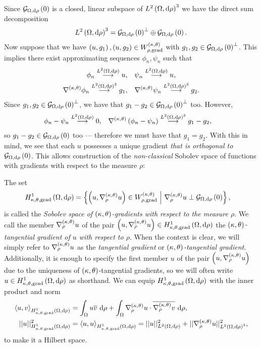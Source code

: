Since $\gradZero{\ddom}{\rho}$ is a closed, linear subspace of $\ltwo{\ddom}{\rho}^3$ we have the direct sum decomposition
\begin{align*}
	\ltwo{\ddom}{\rho}^3 = \gradZero{\ddom}{\rho}^{\perp} \oplus \gradZero{\ddom}{\rho}.
\end{align*}
Now suppose that we have $\bracs{u,g_1}, \bracs{u,g_2}\in W^{\kt}_{\rho,\mathrm{grad}}$ with $g_1, g_2\in\gradZero{\ddom}{\rho}^\perp$.
This implies there exist approximating sequences $\phi_n, \psi_n$ such that
\begin{align*}
	\phi_n \lconv{\ltwo{\ddom}{\rho}} u, &\quad \psi_n \lconv{\ltwo{\ddom}{\rho}} u, \\
	\ktgrad\phi_n \lconv{\ltwo{\ddom}{\rho}^3} g_1, &\quad \ktgrad\psi_n \lconv{\ltwo{\ddom}{\rho}^3} g_2.
\end{align*}
Since $g_1, g_2\in \gradZero{\ddom}{\rho}^{\perp}$, we have that $g_1-g_2\in \gradZero{\ddom}{\rho}^{\perp}$ too.
However, 
\begin{align*}
	\phi_n - \psi_n \lconv{\ltwo{\ddom}{\rho}} 0, &\quad \ktgrad\bracs{\phi_n-\psi_n} \lconv{\ltwo{\ddom}{\rho}^3} g_1 - g_2,
\end{align*}
so $g_1 - g_2\in \gradZero{\ddom}{\rho}$ too --- therefore we must have that $g_1=g_2$.
With this in mind, we see that each $u$ possesses a unique gradient \emph{that is orthogonal to} $\gradZero{\ddom}{\rho}$.
This allows construction of the \emph{non-classical} Sobolev space of functions with gradients with respect to the measure $\rho$:
\begin{definition} \label{def:3DGradSobSpace}
	The set
	\begin{align*}
		\ktgradSob{\ddom}{\rho} &= \clbracs{ \bracs{u, \ktgrad_{\rho}u}\in W^{\kt}_{\rho,\mathrm{grad}} \setVert \ktgrad_{\rho}u \perp \gradZero{\ddom}{\rho} },
	\end{align*}
	is called the \emph{Sobolev space of $\kt$-gradients with respect to the measure $\rho$}.
	We call the member $\ktgrad_{\rho}u$ of the pair $\bracs{u, \ktgrad_{\rho}u}\in\ktgradSob{\ddom}{\rho}$ the \emph{$\kt$-tangential gradient of $u$ with respect to $\rho$}.
	When the context is clear, we will simply refer to $\ktgrad_{\rho}u$ as the \emph{tangential gradient} or \emph{$\kt$-tangential gradient}.
	Additionally, it is enough to specify the first member $u$ of the pair $\bracs{u, \ktgrad_{\rho}u}$ due to the uniqueness of $\kt$-tangential gradients, so we will often write $u\in\ktgradSob{\ddom}{\rho}$ as shorthand.
	We can equip $\ktgradSob{\ddom}{\rho}$ with the inner product and norm
	\begin{align*}
		\ip{u}{v}_{\ktgradSob{\ddom}{\rho}} 
		&= \integral{\ddom}{u\overline{v}}{\rho}
		+ \integral{\ddom}{\ktgrad_{\rho}u \cdot \overline{\ktgrad_{\rho}v}}{\rho}, \\
		\norm{u}_{\ktgradSob{\ddom}{\rho}}^2 &= \ip{u}{u}_{\ktgradSob{\ddom}{\rho}}
		= \norm{u}_{\ltwo{\ddom}{\rho}}^2 + \norm{\ktgrad_{\rho}u}_{\ltwo{\ddom}{\rho}^3}^2,
	\end{align*}		
	to make it a Hilbert space.
\end{definition}

